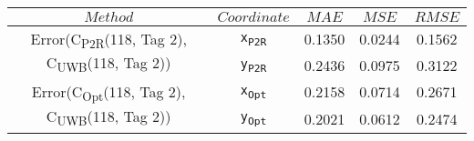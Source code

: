 \begin{table}[h]
\centering
\begin{tabular}{|c|c|c|c|c|}
\hline
$Method$ & $Coordinate$ & $MAE$ & $MSE$ & $RMSE$ \\
\hline
\multirow{2}{*}{{\footnotesize Error(C\textsubscript{P2R}(118, Tag 2), C\textsubscript{UWB}(118, Tag 2))}} & \texttt{x\textsubscript{P2R}} & 0.1350 & 0.0244 & 0.1562 \\
& \texttt{y\textsubscript{P2R}} & 0.2436 & 0.0975 & 0.3122 \\
\hline
\multirow{2}{*}{{\footnotesize Error(C\textsubscript{Opt}(118, Tag 2), C\textsubscript{UWB}(118, Tag 2))}} & \texttt{x\textsubscript{Opt}} & 0.2158 & 0.0714 & 0.2671 \\
& \texttt{y\textsubscript{Opt}} & 0.2021 & 0.0612 & 0.2474 \\
\hline
\end{tabular}
\end{table}
